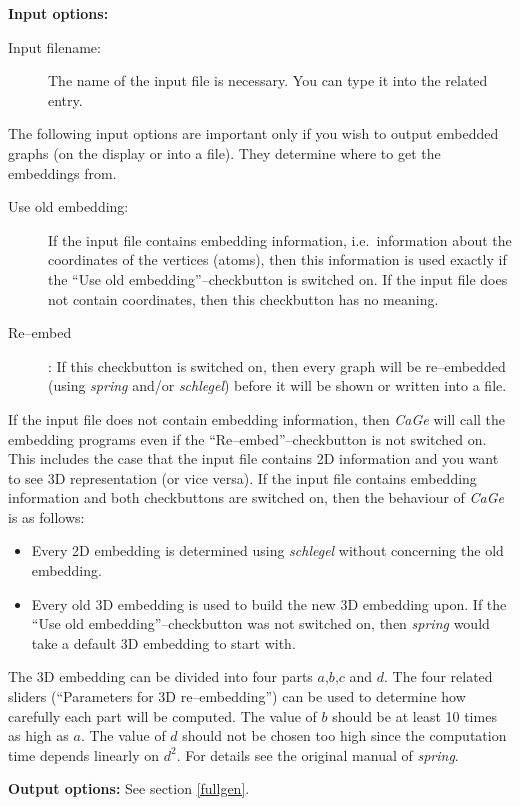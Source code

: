 \documentclass[a4paper]{article}
\def\CaGe{\textit{CaGe}}
\begin{document}
\noindent\textbf{Input options:} 
\begin{description}
\item[Input filename:] The name of the input file is necessary. You can type
it into the related entry.
\end{description}
The following input options are important only if you wish to output embedded
graphs (on the display or into a file). They determine where to get the
embeddings from. 
\begin{description}
\item[Use old embedding:] If the input file contains embedding information,
i.e.~information about the
coordinates of the vertices (atoms), then this information is used exactly if
the ``Use old embedding''--checkbutton is switched on. If the input file does
not contain coordinates, then this checkbutton has no meaning.
\item[Re--embed]: If this checkbutton is switched on, then every graph will
be re--embedded (using \textit{spring} and/or \textit{schlegel}) before it will
be shown or written into a file. 
\end{description}
If the input file does not contain embedding information, then \CaGe{} will
call the embedding programs even if the ``Re--embed''--checkbutton is not
switched on. This includes the case that the input file contains 2D information
and you want to see 3D representation (or vice versa). If the input file
contains embedding information and both checkbuttons are switched on, then
the behaviour of \CaGe{} is as follows:
\begin{itemize}
\item Every 2D embedding is 
determined using \textit{schlegel} without concerning
the old embedding.
\item Every old 3D embedding is used to build the new 3D embedding upon. If the
``Use old embedding''--checkbutton was not switched on, then \textit{spring}
would take a default 3D embedding to start with.
\end{itemize}
The 3D embedding can be divided into four parts $a$,$b$,$c$ and $d$. 
The four related
sliders (``Parameters for 3D re--embedding'') can be used to determine how
carefully each part will be computed. The value of $b$ should be at least 10
times as high as $a$. The value of $d$ should not be chosen too high since
the computation time depends linearly on $d^2$.
For details see the original manual of \textit{spring}.

\noindent\textbf{Output options:} See section \ref{fullgen}.
\end{document}
